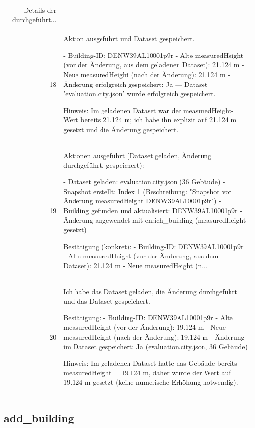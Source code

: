 \documentclass[a4paper,11pt]{article}
\begin{document}
\begin{table}[ht]
\begin{tabular}{r p{12cm}}
Details der durchgeführt... \\
18 & Aktion ausgeführt und Dataset gespeichert.

- Building-ID: DENW39AL10001p9r
- Alte measuredHeight (vor der Änderung, aus dem geladenen Dataset): 21.124 m
- Neue measuredHeight (nach der Änderung): 21.124 m
- Änderung erfolgreich gespeichert: Ja — Dataset 'evaluation.city.json' wurde erfolgreich gespeichert.

Hinweis: Im geladenen Dataset war der measuredHeight-Wert bereits 21.124 m; ich habe ihn explizit auf 21.124 m gesetzt und die Änderung gespeichert. \\
19 & Aktionen ausgeführt (Dataset geladen, Änderung durchgeführt, gespeichert):

- Dataset geladen: evaluation.city.json (36 Gebäude)
- Snapshot erstellt: Index 1 (Beschreibung: "Snapshot vor Änderung measuredHeight DENW39AL10001p9r")
- Building gefunden und aktualisiert: DENW39AL10001p9r
- Änderung angewendet mit enrich\_building (measuredHeight gesetzt)

Bestätigung (konkret):
- Building-ID: DENW39AL10001p9r
- Alte measuredHeight (vor der Änderung, aus dem Dataset): 21.124 m
- Neue measuredHeight (n... \\
20 & Ich habe das Dataset geladen, die Änderung durchgeführt und das Dataset gespeichert.

Bestätigung:
- Building-ID: DENW39AL10001p9r
- Alte measuredHeight (vor der Änderung): 19.124 m
- Neue measuredHeight (nach der Änderung): 19.124 m
- Änderung im Dataset gespeichert: Ja (evaluation.city.json, 36 Gebäude)

Hinweis: Im geladenen Dataset hatte das Gebäude bereits measuredHeight = 19.124 m, daher wurde der Wert auf 19.124 m gesetzt (keine numerische Erhöhung notwendig). \\
\hline
\end{tabular}
\end{table}

\clearpage
\subsection{add\_building}
\end{document}
